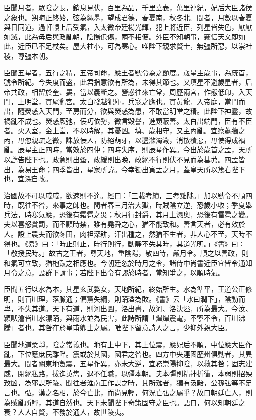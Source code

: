 \begin{pinyinscope}
臣聞月者，眾陰之長，銷息見伏，百里為品，千里立表，萬里連紀，妃后大臣諸侯之象也。朔晦正終始，弦為繩墨，望成君德，春夏南，秋冬北。間者，月數以春夏與日同道，過軒轅上后受氣，入太微帝廷楊光輝，犯上將近臣，列星皆失色，厭厭如滅，此為母后與政亂朝，陰陽俱傷，兩不相便。外臣不知朝事，竊信天文即如此，近臣已不足杖矣。屋大柱小，可為寒心。唯陛下親求賢士，無彊所惡，以崇社稷，尊彊本朝。

臣聞五星者，五行之精，五帝司命，應王者號令為之節度。歲星主歲事，為統首，號令所紀，今失度而盛，此君指意欲有所為，未得其節也。又填星不避歲星者，后帝共政，相留於奎、婁，當以義斷之。營惑往來亡常，周歷兩宮，作態低卬，入天門，上明堂，貫尾亂宮。太白發越犯庫，兵寇之應也。貫黃龍，入帝庭，當門而出，隨熒惑入天門，至房而分，欲與熒惑為患，不敢當明堂之精。此陛下神靈，故禍亂不成也。熒惑厥弛，佞巧依勢，微言毀譽，進類蔽善。太白出端門，臣有不臣者。火入室，金上堂，不以時解，其憂凶。填、歲相守，又主內亂。宜察蕭牆之內，毋忽親疏之微，誅放佞人，防絕萌牙，以盪滌濁濊，消散積惡，毋使得成禍亂。辰星主正四時，當效於四仲；四時失序，則辰星作異。今出於歲首之孟，天所以譴告陛下也。政急則出蚤，政緩則出晚，政絕不行則伏不見而為彗茀。四孟皆出，為易王命；四季皆出，星家所諱。今幸獨出寅孟之月，蓋皇天所以篤右陛下也，宜深自改。

治國故不可以戚戚，欲速則不達。經曰：「三載考績，三考黜陟。」加以號令不順四時，既往不咎，來事之師也。間者春三月治大獄，時賊陰立逆，恐歲小收；季夏舉兵法，時寒氣應，恐後有霜雹之災；秋月行封爵，其月土濕奧，恐後有雷雹之變。夫以喜怒賞罰，而不顧時禁，雖有堯舜之心，猶不能致和。善言天者，必有效於人。設上農夫而欲冬田，肉袒深耕，汗出種之，然猶不生者，非人心不至，天時不得也。《易》曰：「時止則止，時行則行，動靜不失其時，其道光明。」《書》曰：「敬授民時。」故古之王者，尊天地，重陰陽，敬四時，嚴月令。順之以善政，則和氣可立致，猶枹鼓之相應也。今朝廷忽於時月之令，諸侍中尚書近臣宜皆令通知月令之意，設群下請事；若陛下出令有謬於時者，當知爭之，以順時氣。

臣聞五行以水為本，其星玄武婺女，天地所紀，終始所生。水為準平，王道公正修明，則百川理，落脈通；偏黨失綱，則踊溢為敗。《書》云「水曰潤下」，陰動而卑，不失其道。天下有道，則河出圖，洛出書，故河、洛決溢，所為最大。今汝、潁畎澮皆川水漂踊，與雨水並為民害，此詩所謂「㷸㷸震電，不寧不令，百川沸騰」者也。其咎在於皇甫卿士之屬。唯陛下留意詩人之言，少抑外親大臣。

臣聞地道柔靜，陰之常義也。地有上中下，其上位震，應妃后不順，中位應大臣作亂，下位應庶民離畔。震或於其國，國君之咎也。四方中央連國歷州俱動者，其異最大。間者關東地數震，五星作異，亦未大逆，宜務崇陽抑陰，以救其咎；固志建威，閉絕私路，拔進英雋，退不任職，以彊本朝。夫本彊則精神折衝，本弱則招殃致凶，為邪謀所陵。聞往者淮南王作謀之時，其所難者，獨有汲黯，公孫弘等不足言也。弘，漢之名相，於今亡比，而尚見輕，何況亡弘之屬乎？故曰朝廷亡人，則為賊亂所輕，其道自然也。天下未聞陛下奇策固守之臣也。語曰，何以知朝廷之衰？人人自賢，不務於通人，故世陵夷。


\end{pinyinscope}
